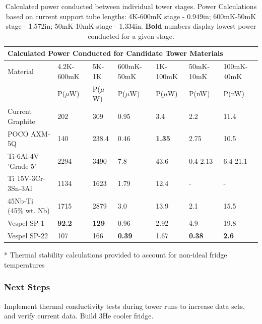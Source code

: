 \documentclass{report}
\begin{document}
\begin{multicols}{2}
\begin{table}[htb]
\begin{threeparttable}
{\footnotesize\rm\begin{tabularx}{17.7cm}{l|XXXXXX}
  \multicolumn{7}{l}{{\large Calculated Power Conducted for Candidate Tower Materials}}\\
\toprule
 {\normalsize Material} & 4.2K-600mK  &5K-1K\tnote{*}& 600mK-50mK & 1K-100mK\tnote{*} & 50mK-10mK & 100mK-40mK\tnote{*} \\
  &P($\mu$W)&P($\mu$W)&P($\mu$W)&P($\mu$W)& P(nW) & P(nW) \\ \hline\hline
  Current Graphite & 202 & 309 & 0.95 & 3.4 & 2.2 & 11.4 \\
  POCO AXM-5Q & 140 & 238.4 & 0.46 & \textbf{1.35} & 2.75 & 10.5 \\
  Ti-6Al-4V 'Grade 5' & 2294 & 3490 & 7.8 & 43.6 & 0.4-2.13 & 6.4-21.1 \\
  Ti 15V-3Cr-3Sn-3Al & 1134 & 1623 & 1.79 & 12.4 & - & - \\
  45Nb-Ti (45\% wt. Nb) & 1715 & 2879 & 3.0 & 13.9 & 2.1 & 15.5 \\
  Vespel SP-1 & \textbf{92.2} & \textbf{129} & 0.96 & 2.92 & 4.9 & 19.8 \\
  Vespel SP-22 & 107 & 166 & \textbf{0.39} & 1.67 & \textbf{0.38} & \textbf{2.6} \\
\bottomrule
\end{tabularx}
\begin{tablenotes}
   \item[*]{Thermal stability calculations provided to account for non-ideal fridge temperatures}
\end{tablenotes}}
\caption{Calculated power conducted between individual tower stages. Power Calculations
based on current support tube lengths: 4K-600mK stage - 0.949in; 600mK-50mK stage - 1.572in;
50mK-10mK stage - 1.334in. \textbf{Bold} numbers display lowest power conducted for a given
stage.}
\end{threeparttable}
\end{table}

\subsubsection{Next Steps}

Implement thermal conductivity tests during tower runs to increase data sets, and verify
current data. Build 3He cooler fridge.


\end{multicols}
\end{document}
